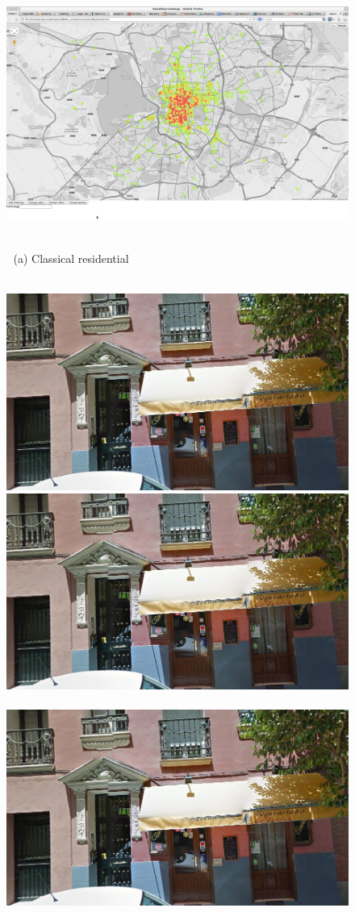 \documentclass[runningheads]{llncs}
\begin{document}
\begin{figure}
\begin{minipage}{\linewidth}
\begin{minipage}{0.3\linewidth}
    \end{minipage}
    \begin{minipage}{0.7\linewidth}
      \includegraphics[trim= 350 150 250 150, clip=true, width=\linewidth]{imgs/arch/mapS2.jpg}
    \end{minipage}
  \end{minipage}
  \\
  $\;$ \hspace{30mm} (a) Classical residential
  \\
  \\
  \begin{minipage}{\linewidth}
    \begin{minipage}{0.3\linewidth}
      \includegraphics[width=0.49\linewidth]{imgs/cutout_pitch04.jpg}
      \includegraphics[width=0.49\linewidth]{imgs/cutout_pitch04.jpg}
      \\ \vspace{-3mm} \\
      \includegraphics[width=0.49\linewidth]{imgs/cutout_pitch04.jpg}

\end{minipage}
\end{minipage}
\end{figure}
\end{document}
